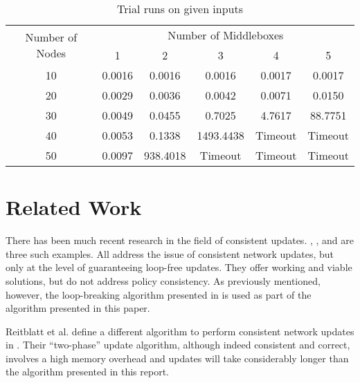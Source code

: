 \documentclass[pageno]{jpaper}
\begin{document}
\begin{table}
\centering
\begin{tabular}{ | c | c c c c c | }
    \hline
    \multirow{2}{*}{Number of Nodes} & \multicolumn{5}{|c|}{Number of Middleboxes} \\ 
     &  1 & 2 & 3 & 4 & 5 \\ \hline
    10 & 0.0016 & 0.0016 & 0.0016 & 0.0017 & 0.0017 \\ \hline
    20 & 0.0029 & 0.0036 & 0.0042 & 0.0071 & 0.0150 \\ \hline
    30 & 0.0049 & 0.0455 & 0.7025 & 4.7617 & 88.7751 \\ \hline
    40 & 0.0053 & 0.1338 & 1493.4438 & Timeout & Timeout \\ \hline
    50 & 0.0097 & 938.4018 & Timeout & Timeout & Timeout \\ \hline
\end{tabular}
\caption{Trial runs on given inputs}
\label{tab:trials}
\end{table} 

\section{Related Work}
\label{sec:relatedwork}
There has been much recent research in the field of consistent updates. \cite{francois05}, \cite{vanbever11}, and \cite{mahajan13} are three such examples. All address the issue of consistent network updates, but only at the level of guaranteeing loop-free updates. They offer working and viable solutions, but do not address policy consistency. As previously mentioned, however, the loop-breaking algorithm presented in \cite{vanbever11} is used as part of the algorithm presented in this paper.

Reitblatt et al. define a different algorithm to perform consistent network updates in \cite{reitblatt12}. Their ``two-phase'' update algorithm, although indeed consistent and correct, involves a high memory overhead and updates will take considerably longer than the algorithm presented in this report.
\end{document}
